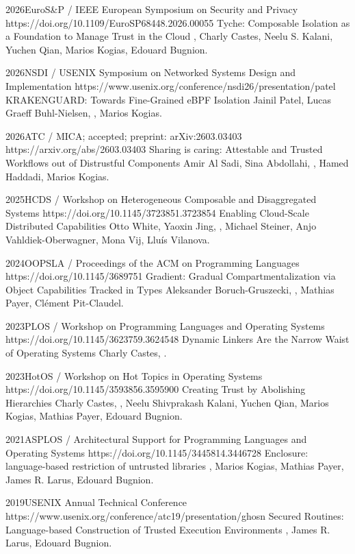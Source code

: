 
\cvpublication
  {2026}{EuroS\&P / IEEE European Symposium on Security and Privacy}
  {https://doi.org/10.1109/EuroSP68448.2026.00055}
  {Tyche: Composable Isolation as a Foundation to Manage Trust in the Cloud}
  {, Charly Castes, Neelu S. Kalani, Yuchen Qian,
   Marios Kogias, Edouard Bugnion.}

\cvpublication
  {2026}{NSDI / USENIX Symposium on Networked Systems Design and Implementation}
  {https://www.usenix.org/conference/nsdi26/presentation/patel}
  {KRAKENGUARD: Towards Fine-Grained eBPF Isolation}
  {Jainil Patel, Lucas Graeff Buhl-Nielsen, , Marios Kogias.}

\cvpublication
  {2026}{ATC / MICA; accepted; preprint: arXiv:2603.03403}
  {https://arxiv.org/abs/2603.03403}
  {Sharing is caring: Attestable and Trusted Workflows out of Distrustful Components}
  {Amir Al Sadi, Sina Abdollahi, , Hamed Haddadi, Marios Kogias.}

\cvpublication
  {2025}{HCDS / Workshop on Heterogeneous Composable and Disaggregated Systems}
  {https://doi.org/10.1145/3723851.3723854}
  {Enabling Cloud-Scale Distributed Capabilities}
  {Otto White, Yaoxin Jing, , Michael Steiner,
   Anjo Vahldiek-Oberwagner, Mona Vij, Llu\'is Vilanova.}

\cvpublication
  {2024}{OOPSLA / Proceedings of the ACM on Programming Languages}
  {https://doi.org/10.1145/3689751}
  {Gradient: Gradual Compartmentalization via Object Capabilities Tracked in Types}
  {Aleksander Boruch-Gruszecki, , Mathias Payer, Cl\'ement Pit-Claudel.}

\cvpublication
  {2023}{PLOS / Workshop on Programming Languages and Operating Systems}
  {https://doi.org/10.1145/3623759.3624548}
  {Dynamic Linkers Are the Narrow Waist of Operating Systems}
  {Charly Castes, .}

\cvpublication
  {2023}{HotOS / Workshop on Hot Topics in Operating Systems}
  {https://doi.org/10.1145/3593856.3595900}
  {Creating Trust by Abolishing Hierarchies}
  {Charly Castes, , Neelu Shivprakash Kalani, Yuchen Qian,
   Marios Kogias, Mathias Payer, Edouard Bugnion.}

\cvpublication
  {2021}{ASPLOS / Architectural Support for Programming Languages and Operating Systems}
  {https://doi.org/10.1145/3445814.3446728}
  {Enclosure: language-based restriction of untrusted libraries}
  {, Marios Kogias, Mathias Payer, James R. Larus, Edouard Bugnion.}

\cvpublication
  {2019}{USENIX Annual Technical Conference}
  {https://www.usenix.org/conference/atc19/presentation/ghosn}
  {Secured Routines: Language-based Construction of Trusted Execution Environments}
  {, James R. Larus, Edouard Bugnion.}
